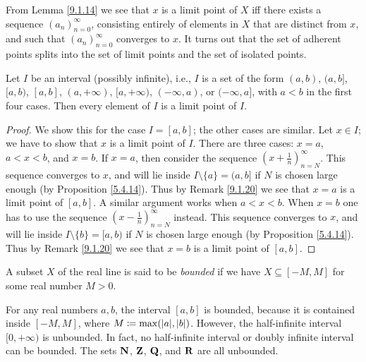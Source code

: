 \setcounter{theorem}{19}
\begin{remark}\label{9.1.20}
    From Lemma \ref{9.1.14} we see that \(x\) is a limit point of \(X\) iff there exists a sequence \((a_n)_{n = 0}^\infty\), consisting entirely of elements in \(X\) that are distinct from \(x\), and such that \((a_n)_{n = 0}^\infty\) converges to \(x\).
    It turns out that the set of adherent points splits into the set of limit points and the set of isolated points.
\end{remark}

\begin{lemma}\label{9.1.21}
    Let \(I\) be an interval (possibly infinite), i.e., \(I\) is a set of the form \((a, b)\), \((a, b]\), \([a, b)\), \([a, b]\), \((a, +\infty)\), \([a, +\infty)\), \((-\infty, a)\), or \((-\infty, a]\), with \(a < b\) in the first four cases.
    Then every element of \(I\) is a limit point of \(I\).
\end{lemma}

\begin{proof}
    We show this for the case \(I = [a, b]\);
    the other cases are similar.
    Let \(x \in I\);
    we have to show that \(x\) is a limit point of \(I\).
    There are three cases: \(x = a\), \(a < x < b\), and \(x = b\).
    If \(x = a\), then consider the sequence \((x + \frac{1}{n})_{n = N}^\infty\).
    This sequence converges to \(x\), and will lie inside \(I \setminus \{a\} = (a, b]\) if \(N\) is chosen large enough (by Proposition \ref{5.4.14}).
    Thus by Remark \ref{9.1.20} we see that \(x = a\) is a limit point of \([a, b]\).
    A similar argument works when \(a < x < b\).
    When \(x = b\) one has to use the sequence \((x - \frac{1}{n})_{n = N}^\infty\) instead.
    This sequence converges to \(x\), and will lie inside \(I \setminus \{b\} = [a, b)\) if \(N\) is chosen large enough (by Proposition \ref{5.4.14}).
    Thus by Remark \ref{9.1.20} we see that \(x = b\) is a limit point of \([a, b]\).
\end{proof}

\begin{definition}\label{9.1.22}
    A subset \(X\) of the real line is said to be \emph{bounded} if we have \(X \subseteq [-M, M]\) for some real number \(M > 0\).
\end{definition}

\begin{example}\label{9.1.23}
    For any real numbers \(a, b\), the interval \([a, b]\) is bounded, because it is contained inside \([-M, M]\), where \(M \coloneqq \max(\abs{a}, \abs{b})\).
    However, the half-infinite interval \([0, +\infty)\) is unbounded.
    In fact, no half-infinite interval or doubly infinite interval can be bounded.
    The sets \(\mathbf{N}\), \(\mathbf{Z}\), \(\mathbf{Q}\), and \(\mathbf{R}\) are all unbounded.
\end{example}

